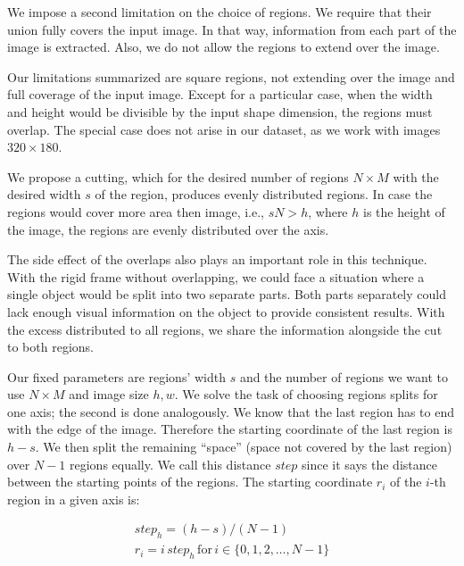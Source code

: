 We impose a second limitation on the choice of regions. We require that their union fully covers the input image. In that way, information from each part of the image is extracted. Also, we do not allow the regions to extend over the image. 

Our limitations summarized are square regions, not extending over the image and full coverage of the input image. Except for a particular case, when the width and height would be divisible by the input shape dimension, the regions must overlap. The special case does not arise in our dataset, as we work with images $320 \times 180$.

We propose a cutting, which for the desired number of regions $N \times M$ with the desired width $s$ of the region, produces evenly distributed regions. In case the regions would cover more area then image, i.e., $sN > h$, where $h$ is the height of the image, the regions are evenly distributed over the axis.


The side effect of the overlaps also plays an important role in this technique. With the rigid frame without overlapping, we could face a situation where a single object would be split into two separate parts. Both parts separately could lack enough visual information on the object to provide consistent results. With the excess distributed to all regions, we share the information alongside the cut to both regions.

Our fixed parameters are regions' width $s$ and the number of regions we want to use $N \times M$ and image size $h, w$. We solve the task of choosing regions splits for one axis; the second is done analogously. We know that the last region has to end with the edge of the image. Therefore the starting coordinate of the last region is $h - s$. We then split the remaining ``space'' (space not covered by the last region) over $N-1$ regions equally. We call this distance $step$ since it says the distance between the starting points of the regions. The starting coordinate $r_i$ of the $i$-th region in a given axis is:

\begin{align*}
step_h = (h - s) / (N - 1) \\
r_i = {i \, step_h\,\text{for}\,i \in \{0, 1, 2, \dots, N - 1\}}
\end{align*}

